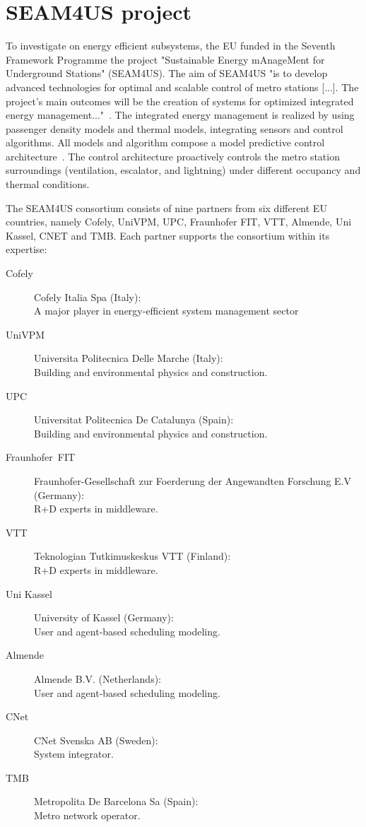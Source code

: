 
\section{SEAM4US project}
\label{subsec:seam4us}

To investigate on energy efficient subsystems, the EU funded in the Seventh Framework Programme the project "Sustainable Energy mAnageMent for Underground Stations" (SEAM4US).
The aim of SEAM4US "is to develop advanced technologies for optimal and scalable control of metro stations [...]. The project's main outcomes will be the creation of systems for optimized integrated energy management..."~\cite{SEAM4US_Website}.
The integrated energy management is realized by using passenger density models and thermal models, integrating sensors and control algorithms. All models and algorithm compose a model predictive control architecture~\cite{ansuini_models_2013}. The control architecture proactively controls the metro station surroundings (ventilation, escalator, and lightning) under different occupancy and thermal conditions.

The SEAM4US consortium consists of nine partners from six different EU countries, namely Cofely, UniVPM, UPC, Fraunhofer FIT, VTT, Almende, Uni Kassel, CNET and TMB. Each partner supports the consortium within its expertise:

\begin{description}
  \item[Cofely] Cofely Italia Spa (Italy):\\A major player in energy-efficient system management sector
  \item[UniVPM] Universita Politecnica Delle Marche (Italy):\\Building and environmental physics and construction.
  \item[UPC] Universitat Politecnica De Catalunya (Spain):\\Building and environmental physics and construction.
  \item[Fraunhofer~FIT] Fraunhofer-Gesellschaft zur Foerderung der Angewandten Forschung E.V (Germany):\\R+D experts in middleware.
  \item[VTT] Teknologian Tutkimuskeskus VTT (Finland):\\R+D experts in middleware.
  \item[Uni Kassel] University of Kassel (Germany):\\User and agent-based scheduling modeling.
  \item[Almende] Almende B.V. (Netherlands):\\User and agent-based scheduling modeling.
  \item[CNet] CNet Svenska AB (Sweden):\\System integrator.
  \item[TMB] Metropolita De Barcelona Sa (Spain):\\Metro network operator.
\end{description}


